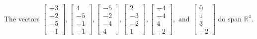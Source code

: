 \begin{exercise}
\begin{exerciseStatement}
  \end{exerciseStatement}
  \begin{exerciseAnswer}
   The vectors \(\left[\begin{array}{r}
-3 \\
-2 \\
-5 \\
-1
\end{array}\right] , \left[\begin{array}{r}
4 \\
-5 \\
-1 \\
-1
\end{array}\right] , \left[\begin{array}{r}
-5 \\
-2 \\
-4 \\
4
\end{array}\right] , \left[\begin{array}{r}
2 \\
-3 \\
-2 \\
1
\end{array}\right] , \left[\begin{array}{r}
-4 \\
-4 \\
4 \\
-2
\end{array}\right] , \text{ and } \left[\begin{array}{r}
0 \\
1 \\
3 \\
-2
\end{array}\right]\) 
  	 do  
	span \(\mathbb{R}^4\).
  


  \end{exerciseAnswer}
\end{exercise}